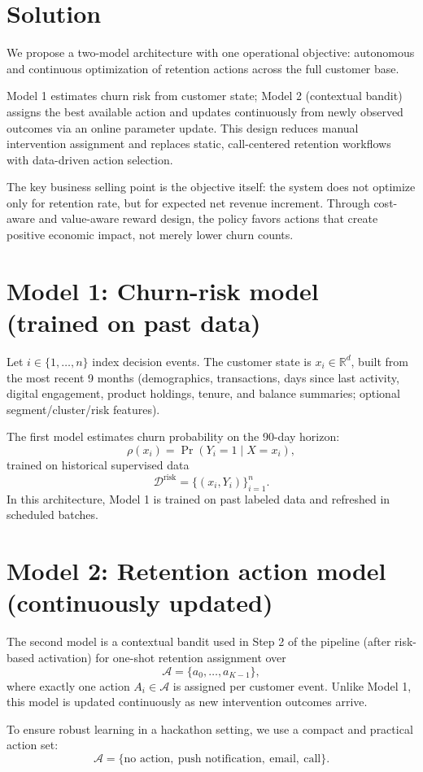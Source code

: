 \documentclass[11pt,a4paper]{article}
\begin{document}
\section{Solution}
We propose a two-model architecture with one operational objective: autonomous and continuous optimization of retention actions across the full customer base.

Model 1 estimates churn risk from customer state; Model 2 (contextual bandit) assigns the best available action and updates continuously from newly observed outcomes via an online parameter update. This design reduces manual intervention assignment and replaces static, call-centered retention workflows with data-driven action selection.

The key business selling point is the objective itself: the system does not optimize only for retention rate, but for expected net revenue increment. Through cost-aware and value-aware reward design, the policy favors actions that create positive economic impact, not merely lower churn counts.

\section{Model 1: Churn-risk model (trained on past data)}
Let $i\in\{1,\dots,n\}$ index decision events. The customer state is $x_i\in\mathbb{R}^d$, built from the most recent 9 months (demographics, transactions, days since last activity, digital engagement, product holdings, tenure, and balance summaries; optional segment/cluster/risk features).

The first model estimates churn probability on the 90-day horizon:
\[
\rho(x_i)=\Pr(Y_i=1\mid X=x_i),
\]
trained on historical supervised data
\[
\mathcal{D}^{\text{risk}}=\{(x_i,Y_i)\}_{i=1}^n.
\]
In this architecture, Model 1 is trained on past labeled data and refreshed in scheduled batches.

\section{Model 2: Retention action model (continuously updated)}
The second model is a contextual bandit used in Step 2 of the pipeline (after risk-based activation) for one-shot retention assignment over
\[
\mathcal{A}=\{a_0,\dots,a_{K-1}\},
\]
where exactly one action $A_i\in\mathcal{A}$ is assigned per customer event. Unlike Model 1, this model is updated continuously as new intervention outcomes arrive.

To ensure robust learning in a hackathon setting, we use a compact and practical action set:
\[
\mathcal{A}=\{\text{no action},\ \text{push notification},\ \text{email},\ \text{call}\}.
\]
\end{document}
